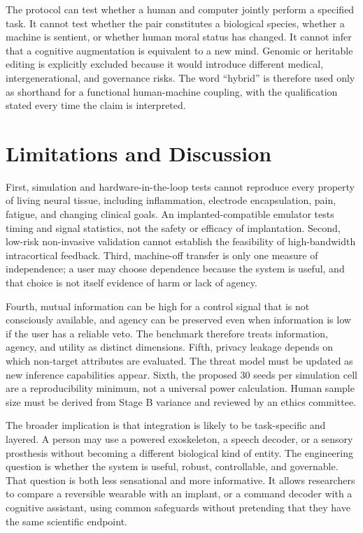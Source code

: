 \documentclass[conference]{IEEEtran}
\begin{document}
The protocol can test whether a human and computer jointly perform a specified task. It cannot test whether the pair constitutes a biological species, whether a machine is sentient, or whether human moral status has changed. It cannot infer that a cognitive augmentation is equivalent to a new mind. Genomic or heritable editing is explicitly excluded because it would introduce different medical, intergenerational, and governance risks. The word ``hybrid'' is therefore used only as shorthand for a functional human-machine coupling, with the qualification stated every time the claim is interpreted.

\section{Limitations and Discussion}

First, simulation and hardware-in-the-loop tests cannot reproduce every property of living neural tissue, including inflammation, electrode encapsulation, pain, fatigue, and changing clinical goals. An implanted-compatible emulator tests timing and signal statistics, not the safety or efficacy of implantation. Second, low-risk non-invasive validation cannot establish the feasibility of high-bandwidth intracortical feedback. Third, machine-off transfer is only one measure of independence; a user may choose dependence because the system is useful, and that choice is not itself evidence of harm or lack of agency.

Fourth, mutual information can be high for a control signal that is not consciously available, and agency can be preserved even when information is low if the user has a reliable veto. The benchmark therefore treats information, agency, and utility as distinct dimensions. Fifth, privacy leakage depends on which non-target attributes are evaluated. The threat model must be updated as new inference capabilities appear. Sixth, the proposed 30 seeds per simulation cell are a reproducibility minimum, not a universal power calculation. Human sample size must be derived from Stage B variance and reviewed by an ethics committee.

The broader implication is that integration is likely to be task-specific and layered. A person may use a powered exoskeleton, a speech decoder, or a sensory prosthesis without becoming a different biological kind of entity. The engineering question is whether the system is useful, robust, controllable, and governable. That question is both less sensational and more informative. It allows researchers to compare a reversible wearable with an implant, or a command decoder with a cognitive assistant, using common safeguards without pretending that they have the same scientific endpoint.
\end{document}
